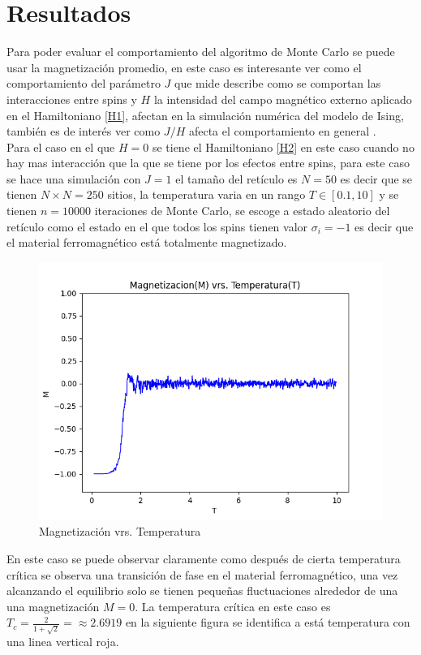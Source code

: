 \documentclass[a4paper]{article}
\begin{document}
\section{Resultados}
Para poder evaluar el comportamiento del algoritmo de Monte Carlo se puede usar la magnetización promedio, en este caso es interesante ver como el comportamiento del parámetro $J$ que mide describe como se comportan las interacciones entre spins y $H$ la intensidad del campo magnético externo aplicado en el Hamiltoniano \ref{H1}, afectan en la simulación numérica del modelo de Ising, también es de interés ver como $J/H$ afecta el comportamiento en general .\\
Para el caso en el que $H=0$ se tiene el Hamiltoniano \ref{H2} en este caso cuando no hay mas interacción que la que se tiene por los efectos entre spins, para este caso se hace una simulación con $J=1$ el tamaño del retículo es $N=50$ es decir que se tienen $N\times N=250$ sitios, la temperatura varia en un rango $T\in[0.1,10]$ y se tienen $n=10000$ iteraciones de Monte Carlo, se escoge a estado aleatorio del retículo como el estado en el que todos los spins tienen valor $\sigma_i=-1$ es decir que el material ferromagnético está totalmente magnetizado.
\begin{figure}[H]
\begin{center}
\includegraphics[scale=0.6]{PlotMvT_sim1.png} 
\end{center} 
\caption{Magnetización vrs. Temperatura}
\end{figure}
En este caso se puede observar claramente como después de cierta temperatura crítica se observa una transición de fase en el material ferromagnético, una vez alcanzando el equilibrio solo se tienen pequeñas fluctuaciones alrededor de una una magnetización $M=0$. La temperatura crítica en este caso es $T_c=\frac{2}{1+\sqrt{2}}=\approx 2.6919$ en la siguiente figura se identifica a está temperatura con una linea vertical roja.
\end{document}
